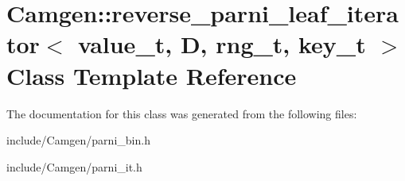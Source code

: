 \hypertarget{a00468}{\section{Camgen\-:\-:reverse\-\_\-parni\-\_\-leaf\-\_\-iterator$<$ value\-\_\-t, D, rng\-\_\-t, key\-\_\-t $>$ Class Template Reference}
\label{a00468}
}


The documentation for this class was generated from the following files\-:\begin{DoxyCompactItemize}
\item 
include/\-Camgen/parni\-\_\-bin.\-h\item 
include/\-Camgen/parni\-\_\-it.\-h\end{DoxyCompactItemize}
